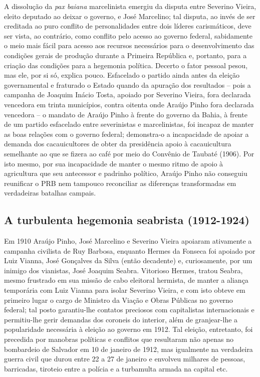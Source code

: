 A dissolução da \textit{pax baiana} marcelinista emergiu da disputa entre Severino Vieira, eleito deputado ao deixar o governo, e José Marcelino; tal disputa, ao invés de ser creditada ao puro conflito de personalidades entre dois líderes carismáticos, deve ser vista, ao contrário, como conflito pelo acesso ao governo federal, sabidamente o meio mais fácil para acesso aos recursos necessários para o desenvolvimento das condições gerais de produção durante a Primeira República e, portanto, para a criação das condições para a hegemonia política. Decerto o fator pessoal pesou, mas ele, por si só, explica pouco. Esfacelado o partido ainda antes da eleição governamental e fraturado o Estado quando da apuração dos resultados -- pois a campanha de Joaquim Inácio Tosta, apoiado por Severino Vieira, fora declarada vencedora em trinta municípios, contra oitenta onde Araújo Pinho fora declarada vencedora -- o mandato de Araújo Pinho à frente do governo da Bahia, à frente de um partido esfacelado entre severinistas e marcelinistas, foi incapaz de manter as boas relações com o governo federal; demonstra-o a incapacidade de apoiar a demanda dos cacauicultores de obter da presidência apoio à cacauicultura semelhante ao que se fizera ao café por meio do Convênio de Taubaté (1906). Por isto mesmo, por sua incapacidade de manter o mesmo ritmo de apoio à agricultura que seu antecessor e padrinho político, Araújo Pinho não conseguiu reunificar o PRB nem tampouco reconciliar as diferenças transformadas em verdadeiras batalhas campais.

\subsection{A turbulenta hegemonia seabrista (1912-1924)}

Em 1910 Araújo Pinho, José Marcelino e Severino Vieira apoiaram ativamente a campanha civilista de Ruy Barbosa, enquanto Hermes da Fonseca foi apoiado por Luiz Vianna, José Gonçalves da Silva (então decadente) e, curiosamente, por um inimigo dos vianistas, José Joaquim Seabra. Vitorioso Hermes, tratou Seabra, mesmo frustrado em sua missão de cabo eleitoral hermista, de manter a aliança temporária com Luiz Vianna para isolar Severino Vieira, e com isto obteve em primeiro lugar o cargo de Ministro da Viação e Obras Públicas no governo federal; tal posto garantiu-lhe contatos preciosos com capitalistas internacionais e permitiu-lhe gerir demandas dos coroneis do interior, além de granjear-lhe a popularidade necessária à eleição ao governo em 1912. Tal eleição, entretanto, foi precedida por manobras políticas e conflitos que resultaram não apenas no bombardeio de Salvador em 10 de janeiro de 1912, mas igualmente na verdadeira guerra civil que durou entre 22 a 27 de janeiro e envolveu milhares de pessoas, barricadas, tiroteio entre a polícia e a turbamulta armada na capital etc. 

